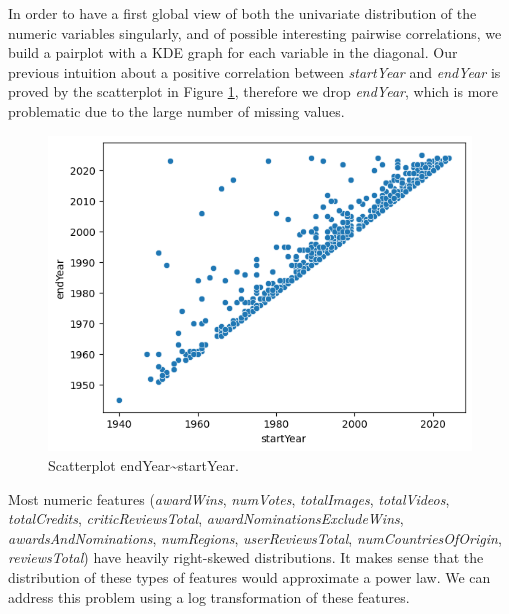 In order to have a first global view of both the univariate distribution of the numeric variables singularly, and of possible interesting pairwise correlations, we build a pairplot with a KDE graph for each variable in the diagonal.
Our previous intuition about a positive correlation between \textit{startYear} and \textit{endYear} is proved by the scatterplot in Figure \ref{fig:scatterplot_endYear_startYear.png}, therefore we drop \textit{endYear}, which is more problematic due to the large number of missing values.

\begin{figure}
    \includegraphics[width=\columnwidth]{../../results/images/scatterplot_endYear_startYear.png}
    \caption{Scatterplot endYear\textasciitilde startYear.}
    \label{fig:scatterplot_endYear_startYear.png}
\end{figure}

Most numeric features (\textit{awardWins}, \textit{numVotes}, \textit{totalImages}, \textit{totalVideos}, \textit{totalCredits}, \textit{criticReviewsTotal}, \textit{awardNominationsExcludeWins}, \textit{awardsAndNominations}, \textit{numRegions}, \textit{userReviewsTotal}, \textit{numCountriesOfOrigin}, \textit{reviewsTotal}) have heavily right-skewed distributions. It makes sense that the distribution of these types of features would approximate a power law. We can address this problem using a log transformation of these features.

